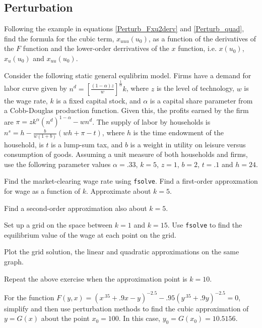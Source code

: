 \documentclass[letterpaper,11pt]{article}
\theoremstyle{definition}
\begin{document}
\begin{spacing}{1.5}
\section*{Perturbation}\label{Perturb_HW}
\setcounter{Exercise}{0}
	\begin{Exercise} \label{Perturb_HW_Cubic}
		Following the example in equations \eqref{Perturb_Fxu2derv} and \eqref{Perturb_quad}, find the formula for the cubic term, $x_{uuu}(u_0)$, as a function of the derivatives of the $F$ function and the lower-order derrivatives of the $x$ function, i.e. $x(u_0)$, $x_u(u_0)$ and $x_{uu}(u_0)$.
	\end{Exercise}

	\begin{Exercise} \label{Perturb_HW02_GEApprox}
		Consider the following static general equlibrim model.  Firms have a demand for labor curve given by $n^d = \left[\frac{(1-\alpha)z}{w}\right]^{\tfrac{1}{\alpha}} k$, where $z$ is the level of technology, $w$ is the wage rate, $k$ is a fixed capital stock, and $\alpha$ is a capital share parameter from a Cobb-Douglas production function.  Given this, the profits earned by the firm are $\pi = zk^\alpha (n^d)^{1-\alpha} - w n^d$.  The supply of labor by households is $n^s = h - \frac{b}{w(1+b)}(wh+\pi-t)$, where $h$ is the time endowment of the household, is $t$ is a lump-sum tax, and $b$ is a weight in utility on leisure versus consumption of goods.  Assuming a unit measure of both households and firms, use the following parameter values $\alpha = .33$, $k=5$, $z=1$, $b=2$, $t=.1$ and $h=24$.

		Find the market-clearing wage rate using {\tt fsolve}.  Find a first-order approxmation for wage as a function of $k$.  Approximate about $k=5$.

		Find a second-order approximation also about $k=5$.

		Set up a grid on the space between $k=1$ and $k=15$. Use {\tt fsolve} to find the equilibrium value of the wage at each point on the grid.

		Plot the grid solution, the linear and quadratic approximations on the same graph.

		Repeat the above exercise when the approximation point is $k=10$.
	\end{Exercise}

	\begin{Exercise} \label{Perturb_HW_Bivar_Grid}
		For the function $F(y,x) =(x^{.35} + .9x - y)^{-2.5} - .95(y^{.35} + .9y )^{-2.5} = 0$, simplify and then use perturbation methods to find the cubic approximation of $y=G(x)$ about the point $x_0=100$.  In this case, $y_0=G(x_0)=10.5156$.


\end{Exercise}
\end{spacing}
\end{document}
